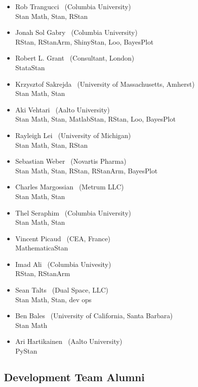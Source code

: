 \begin{itemize}
\\ {\footnotesize MatlabStan}
\item Rob Trangucci \   (Columbia University)
\\ {\footnotesize Stan Math, Stan, RStan}
\item Jonah Sol Gabry \ (Columbia University)
\\ {\footnotesize RStan, RStanArm, ShinyStan, Loo, BayesPlot}
\item Robert L. Grant \ (Consultant, London)
\\ {\footnotesize StataStan}
\item Krzysztof Sakrejda \ (University of Massachusetts, Amherst)
\\ {\footnotesize Stan Math, Stan}
\item Aki Vehtari \ (Aalto University) \\ {\footnotesize Stan Math,
    Stan, MatlabStan, RStan, Loo, BayesPlot}
\item Rayleigh Lei \ (University of Michigan)
\\ {\footnotesize Stan Math, Stan, RStan}
\item Sebastian Weber \ (Novartis Pharma)
\\ {\footnotesize Stan Math, Stan, RStan, RStanArm, BayesPlot}
\item Charles Margossian \ (Metrum LLC)
\\ {\footnotesize Stan Math, Stan}
\item Thel Seraphim \ (Columbia University)
\\ {\footnotesize Stan Math, Stan}
\item Vincent Picaud \ (CEA, France)
\\ {\footnotesize MathematicaStan}
\item Imad Ali \ (Columbia Univesity)
\\ {\footnotesize RStan, RStanArm}
\item Sean Talts \ (Dual Space, LLC)
\\ {\footnotesize Stan Math, Stan, dev ops}
\item Ben Bales \ (University of California, Santa Barbara)
\\ {\footnotesize Stan Math}
\item Ari Hartikainen \ (Aalto University)
\\ {\footnotesize PyStan}

\end{itemize}

\subsection*{Development Team Alumni}

